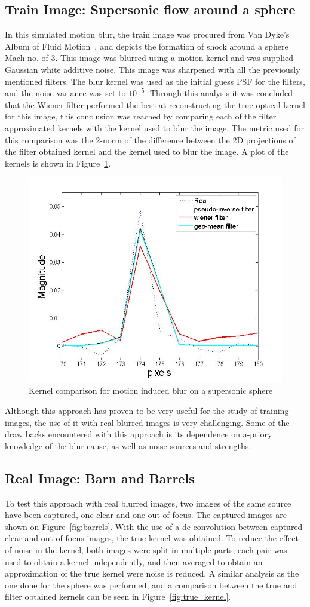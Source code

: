 \subsection{Train Image: Supersonic flow around a sphere}
In this simulated motion blur, the train image was procured from Van Dyke's Album of Fluid Motion~\cite{VanDyke:1982}, and depicts the formation of shock around a sphere Mach no. of  3. This image was blurred using a motion kernel and was supplied Gaussian white additive noise. This image was sharpened with all the previously mentioned filters. The blur kernel was used as the initial guess PSF for the filters, and the noise variance was set to $10^{-5}$. 
Through this analysis it was concluded that the Wiener filter performed the best at reconstructing the true optical kernel for this image, this conclusion was reached by comparing each of the filter approximated kernels with the kernel used to blur the image. The metric used for this comparison was the 2-norm of the difference between the 2D projections of the filter obtained kernel and the kernel used to blur the image. A plot of the kernels is shown in Figure~\ref{fig:sph_kernels}.

\begin{figure}[H]
  \centering
                \centering
                \includegraphics[width=.4\textwidth]{kernel_motion.jpg}
                \caption{Kernel comparison for motion induced blur on a supersonic sphere}
 \label{fig:sph_kernels}
\end{figure}

Although this approach has proven to be very useful for the study of training images, the use of it with real blurred images is very challenging. Some of the draw backs encountered with this approach is its dependence on a-priory knowledge of the blur cause, as well as noise sources and strengths. 
\subsection{Real Image: Barn and Barrels}
To test this approach with real blurred images, two images of the same source have been captured, one clear and one out-of-focus. The captured images are shown on Figure~\ref{fig:barrels}. With the use of a de-convolution between captured clear and out-of-focus images, the true kernel was obtained. To reduce the effect of noise in the kernel, both images were split in multiple parts, each pair was used to obtain a kernel independently, and then averaged to obtain an approximation of the true kernel were noise is reduced. A similar analysis as the one done for the sphere was performed, and a comparison between the true and filter obtained kernels can be seen in Figure~\ref{fig:true_kernel}.

